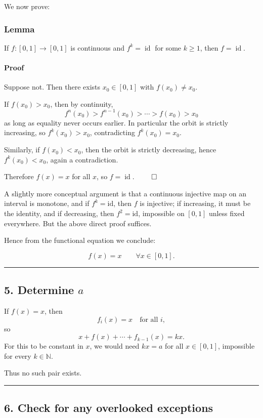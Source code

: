 \documentclass[12pt,a4paper]{article}
\begin{document}
We now prove:

\subsubsection*{Lemma}
If \(f:[0,1]\to[0,1]\) is continuous and \(f^k=\operatorname{id}\) for some \(k\ge 1\), then \(f=\operatorname{id}\).

\paragraph{Proof}
Suppose not. Then there exists \(x_0\in[0,1]\) with \(f(x_0)\ne x_0\).

If \(f(x_0)>x_0\), then by continuity,
\[
f^n(x_0)>f^{n-1}(x_0)>\cdots>f(x_0)>x_0
\]
as long as equality never occurs earlier. In particular the orbit is strictly increasing, so \(f^k(x_0)>x_0\), contradicting \(f^k(x_0)=x_0\).

Similarly, if \(f(x_0)<x_0\), then the orbit is strictly decreasing, hence \(f^k(x_0)<x_0\), again a contradiction.

Therefore \(f(x)=x\) for all \(x\), so \(f=\operatorname{id}\). $\qed$

A slightly more conceptual argument is that a continuous injective map on an interval is monotone, and if \(f^k=\mathrm{id}\), then \(f\) is injective; if increasing, it must be the identity, and if decreasing, then \(f^2=\mathrm{id}\), impossible on \([0,1]\) unless fixed everywhere. But the above direct proof suffices.

Hence from the functional equation we conclude:

\[
f(x)=x \qquad \forall x\in[0,1].
\]


\medskip\hrule\medskip


\subsection*{5. Determine \(a\)}

If \(f(x)=x\), then
\[
f_i(x)=x \quad \text{for all }i,
\]
so
\[
x+f(x)+\cdots+f_{k-1}(x)=kx.
\]
For this to be constant in \(x\), we would need \(kx=a\) for all \(x\in[0,1]\), impossible for every \(k\in\mathbb N\).

Thus no such pair exists.


\medskip\hrule\medskip


\subsection*{6. Check for any overlooked exceptions}
\end{document}
